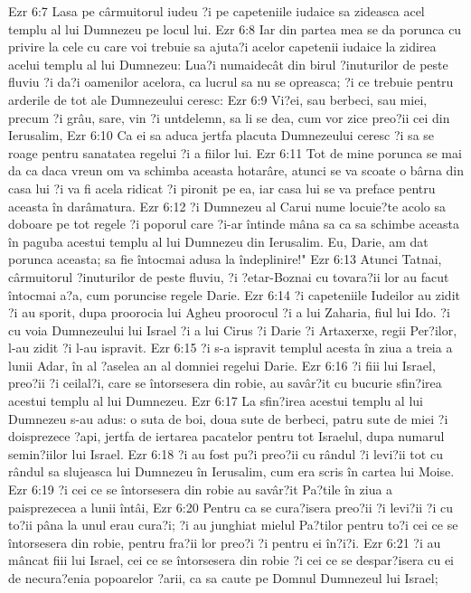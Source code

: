 Ezr 6:7  Lasa pe cârmuitorul iudeu ?i pe capeteniile iudaice sa zideasca acel templu al lui Dumnezeu pe locul lui.
Ezr 6:8  Iar din partea mea se da porunca cu privire la cele cu care voi trebuie sa ajuta?i acelor capetenii iudaice la zidirea acelui templu al lui Dumnezeu: Lua?i numaidecât din birul ?inuturilor de peste fluviu ?i da?i oamenilor acelora, ca lucrul sa nu se opreasca; ?i ce trebuie pentru arderile de tot ale Dumnezeului ceresc:
Ezr 6:9  Vi?ei, sau berbeci, sau miei, precum ?i grâu, sare, vin ?i untdelemn, sa li se dea, cum vor zice preo?ii cei din Ierusalim,
Ezr 6:10  Ca ei sa aduca jertfa placuta Dumnezeului ceresc ?i sa se roage pentru sanatatea regelui ?i a fiilor lui.
Ezr 6:11  Tot de mine porunca se mai da ca daca vreun om va schimba aceasta hotarâre, atunci se va scoate o bârna din casa lui ?i va fi acela ridicat ?i pironit pe ea, iar casa lui se va preface pentru aceasta în darâmatura.
Ezr 6:12  ?i Dumnezeu al Carui nume locuie?te acolo sa doboare pe tot regele ?i poporul care ?i-ar întinde mâna sa ca sa schimbe aceasta în paguba acestui templu al lui Dumnezeu din Ierusalim. Eu, Darie, am dat porunca aceasta; sa fie întocmai adusa la îndeplinire!"
Ezr 6:13  Atunci Tatnai, cârmuitorul ?inuturilor de peste fluviu, ?i ?etar-Boznai cu tovara?ii lor au facut întocmai a?a, cum poruncise regele Darie.
Ezr 6:14  ?i capeteniile Iudeilor au zidit ?i au sporit, dupa proorocia lui Agheu proorocul ?i a lui Zaharia, fiul lui Ido. ?i cu voia Dumnezeului lui Israel ?i a lui Cirus ?i Darie ?i Artaxerxe, regii Per?ilor, l-au zidit ?i l-au ispravit.
Ezr 6:15  ?i s-a ispravit templul acesta în ziua a treia a lunii Adar, în al ?aselea an al domniei regelui Darie.
Ezr 6:16  ?i fiii lui Israel, preo?ii ?i ceilal?i, care se întorsesera din robie, au savâr?it cu bucurie sfin?irea acestui templu al lui Dumnezeu.
Ezr 6:17  La sfin?irea acestui templu al lui Dumnezeu s-au adus: o suta de boi, doua sute de berbeci, patru sute de miei ?i doisprezece ?api, jertfa de iertarea pacatelor pentru tot Israelul, dupa numarul semin?iilor lui Israel.
Ezr 6:18  ?i au fost pu?i preo?ii cu rândul ?i levi?ii tot cu rândul sa slujeasca lui Dumnezeu în Ierusalim, cum era scris în cartea lui Moise.
Ezr 6:19  ?i cei ce se întorsesera din robie au savâr?it Pa?tile în ziua a paisprezecea a lunii întâi,
Ezr 6:20  Pentru ca se cura?isera preo?ii ?i levi?ii ?i cu to?ii pâna la unul erau cura?i; ?i au junghiat mielul Pa?tilor pentru to?i cei ce se întorsesera din robie, pentru fra?ii lor preo?i ?i pentru ei în?i?i.
Ezr 6:21  ?i au mâncat fiii lui Israel, cei ce se întorsesera din robie ?i cei ce se despar?isera cu ei de necura?enia popoarelor ?arii, ca sa caute pe Domnul Dumnezeul lui Israel;
